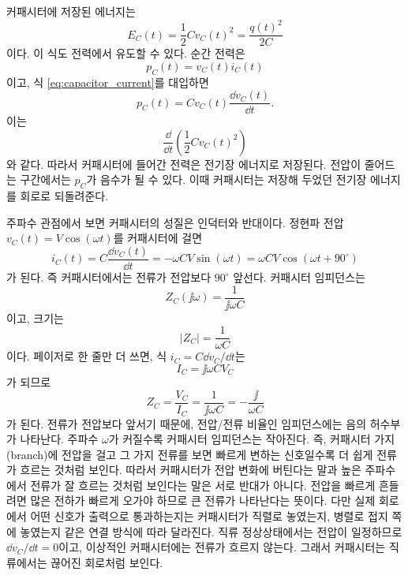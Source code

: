 커패시터에 저장된 에너지는
\begin{equation}
  E_C(t)=\frac{1}{2}C v_C(t)^2
  =
  \frac{q(t)^2}{2C}
  \label{eq:capacitor_energy}
\end{equation}
이다.
이 식도 전력에서 유도할 수 있다.
순간 전력은
\begin{equation}
  p_C(t)=v_C(t)i_C(t)
\end{equation}
이고, 식 \eqref{eq:capacitor_current}를 대입하면
\begin{equation}
  p_C(t)=C v_C(t)\frac{\dd v_C(t)}{\dd t}.
\end{equation}
이는
\begin{equation}
  \frac{\dd}{\dd t}\left(\frac{1}{2}C v_C(t)^2\right)
\end{equation}
와 같다.
따라서 커패시터에 들어간 전력은 전기장 에너지로 저장된다.
전압이 줄어드는 구간에서는 $p_C$가 음수가 될 수 있다.
이때 커패시터는 저장해 두었던 전기장 에너지를 회로로 되돌려준다.

주파수 관점에서 보면 커패시터의 성질은 인덕터와 반대이다.
정현파 전압 $v_C(t)=V\cos(\omega t)$를 커패시터에 걸면
\begin{equation}
  i_C(t)
  =
  C\frac{\dd v_C(t)}{\dd t}
  =
  -\omega C V\sin(\omega t)
  =
  \omega C V\cos(\omega t+90^\circ)
\end{equation}
가 된다.
즉 커패시터에서는 전류가 전압보다 $90^\circ$ 앞선다.
커패시터 임피던스는
\begin{equation}
  Z_C(\jj\omega)=\frac{1}{\jj\omega C}
\end{equation}
이고, 크기는
\begin{equation}
  |Z_C|=\frac{1}{\omega C}
\end{equation}
이다.
페이저로 한 줄만 더 쓰면, 식 $i_C=C\dd v_C/\dd t$는
\begin{equation}
  I_C=\jj\omega C V_C
\end{equation}
가 되므로
\begin{equation}
  Z_C=\frac{V_C}{I_C}
  =
  \frac{1}{\jj\omega C}
  =
  -\frac{\jj}{\omega C}
\end{equation}
가 된다.
전류가 전압보다 앞서기 때문에, 전압/전류 비율인 임피던스에는 음의 허수부가 나타난다.
주파수 $\omega$가 커질수록 커패시터 임피던스는 작아진다.
즉, 커패시터 가지(branch)에 전압을 걸고 그 가지 전류를 보면 빠르게 변하는 신호일수록 더 쉽게 전류가 흐르는 것처럼 보인다.
따라서 커패시터가 전압 변화에 버틴다는 말과 높은 주파수에서 전류가 잘 흐르는 것처럼 보인다는 말은 서로 반대가 아니다.
전압을 빠르게 흔들려면 많은 전하가 빠르게 오가야 하므로 큰 전류가 나타난다는 뜻이다.
다만 실제 회로에서 어떤 신호가 출력으로 통과하는지는 커패시터가 직렬로 놓였는지, 병렬로 접지 쪽에 놓였는지 같은 연결 방식에 따라 달라진다.
직류 정상상태에서는 전압이 일정하므로 $\dd v_C/\dd t=0$이고, 이상적인 커패시터에는 전류가 흐르지 않는다.
그래서 커패시터는 직류에서는 끊어진 회로처럼 보인다.

